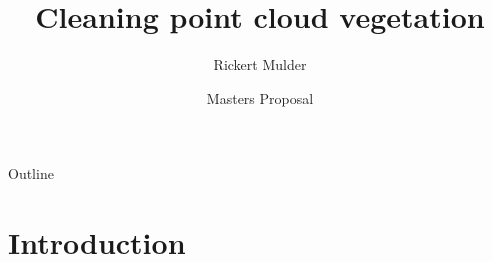 \documentclass[compress]{beamer}
\title{Cleaning point cloud vegetation}
\author{Rickert Mulder}
\institute[U of X]
{
  Department of Computer Science\\
  University of Cape Town
}
\date[CFP 2003] %
{Masters Proposal}
\begin{document}
\begin{frame}
  \titlepage
\end{frame}

\begin{frame}{Outline}
  \tableofcontents
\end{frame}





\section{Introduction}
\end{document}

